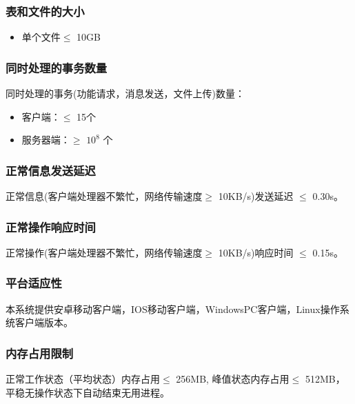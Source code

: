 \subsubsection{表和文件的大小}
\begin{itemize}
	\item 单个文件$\leq$ 10GB
\end{itemize}
\subsubsection{同时处理的事务数量}
同时处理的事务(功能请求，消息发送，文件上传)数量：
\begin{itemize}
	\item 客户端：$\leq$ 15个
	\item 服务器端：$\geq$ $10^{8}$ 个
\end{itemize}
\subsubsection{正常信息发送延迟}
正常信息(客户端处理器不繁忙，网络传输速度$\geq$ 10KB/s)发送延迟 $\leq$ 0.30s。
\subsubsection{正常操作响应时间}
正常操作(客户端处理器不繁忙，网络传输速度$\geq$ 10KB/s)响应时间 $\leq$ 0.15s。
\subsubsection{平台适应性}
本系统提供安卓移动客户端，IOS移动客户端，WindowsPC客户端，Linux操作系统客户端版本。
\subsubsection{内存占用限制}
正常工作状态（平均状态）内存占用$\leq$ 256MB, 峰值状态内存占用$\leq$ 512MB，平稳无操作状态下自动结束无用进程。

